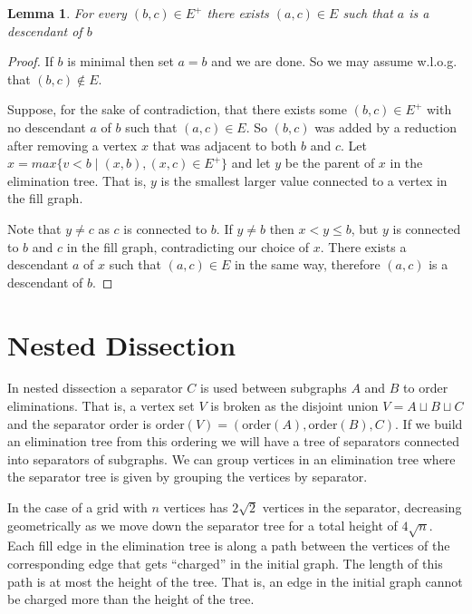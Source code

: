 \documentclass{article}
\newtheorem{lemma}{Lemma}
\begin{document}
\begin{lemma}
    For every $(b, c)\in E^+$ there exists $(a, c)\in E$ such that $a$ is a descendant of $b$
\end{lemma}
\begin{proof}
    If $b$ is minimal then set $a = b$ and we are done.
    So we may assume w.l.o.g. that $(b,c)\notin E$.

    Suppose, for the sake of contradiction, that there exists some $(b, c)\in E^+$ with no descendant $a$ of $b$ such that $(a, c)\in E$.
    So $(b, c)$ was added by a reduction after removing a vertex $x$ that was adjacent to both $b$ and $c$.
    Let $x = max\{v < b\mid (x,b), (x,c)\in E^+\}$ and let $y$ be the parent of $x$ in the elimination tree.
    That is, $y$ is the smallest larger value connected to a vertex in the fill graph.

    Note that $y\neq c$ as $c$ is connected to $b$.
    If $y\neq b$ then $x < y\leq b$, but $y$ is connected to $b$ and $c$ in the fill graph, contradicting our choice of $x$.
    There exists a descendant $a$ of $x$ such that $(a, c)\in E$ in the same way, therefore $(a, c)$ is a descendant of $b$.
\end{proof}

\section{Nested Dissection}

In nested dissection a separator $C$ is used between subgraphs $A$ and $B$ to order eliminations.
That is, a vertex set $V$ is broken as the disjoint union $V = A\sqcup B\sqcup C$ and the separator order is $\mathrm{order}(V) = (\mathrm{order}(A), \mathrm{order}(B), C)$.
If we build an elimination tree from this ordering we will have a tree of separators connected into separators of subgraphs.
We can group vertices in an elimination tree where the separator tree is given by grouping the vertices by separator.

In the case of a grid with $n$ vertices has $2\sqrt{2}$ vertices in the separator, decreasing geometrically as we move down the separator tree for a total height of $4\sqrt{n}$.
Each fill edge in the elimination tree is along a path between the vertices of the corresponding edge that gets ``charged'' in the initial graph.
The length of this path is at most the height of the tree.
That is, an edge in the initial graph cannot be charged more than the height of the tree.
\end{document}
